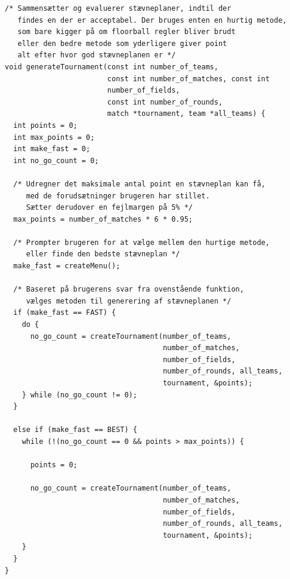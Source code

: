 \hspace{3 cm}
\begin{source}
\begin{verbatim}
/* Sammensætter og evaluerer stævneplaner, indtil der 
   findes en der er acceptabel. Der bruges enten en hurtig metode, 
   som bare kigger på om floorball regler bliver brudt
   eller den bedre metode som yderligere giver point 
   alt efter hvor god stævneplanen er */
void generateTournament(const int number_of_teams, 
                        const int number_of_matches, const int 
                        number_of_fields, 
                        const int number_of_rounds, 
                        match *tournament, team *all_teams) {
  int points = 0;
  int max_points = 0;
  int make_fast = 0;
  int no_go_count = 0;

  /* Udregner det maksimale antal point en stævneplan kan få,
     med de forudsætninger brugeren har stillet.
     Sætter derudover en fejlmargen på 5% */
  max_points = number_of_matches * 6 * 0.95;

  /* Prompter brugeren for at vælge mellem den hurtige metode, 
     eller finde den bedste stævneplan */
  make_fast = createMenu();

  /* Baseret på brugerens svar fra ovenstående funktion, 
     vælges metoden til generering af stævneplanen */
  if (make_fast == FAST) {
    do {
      no_go_count = createTournament(number_of_teams, 
                                     number_of_matches, 
                                     number_of_fields, 
                                     number_of_rounds, all_teams, 
                                     tournament, &points);
    } while (no_go_count != 0);
  }

  else if (make_fast == BEST) {
    while (!(no_go_count == 0 && points > max_points)) {

      points = 0;

      no_go_count = createTournament(number_of_teams, 
                                     number_of_matches, 
                                     number_of_fields, 
                                     number_of_rounds, all_teams, 
                                     tournament, &points);
    }
  }
}

\end{verbatim}
\label{code:generateTournament}
\end{source}
